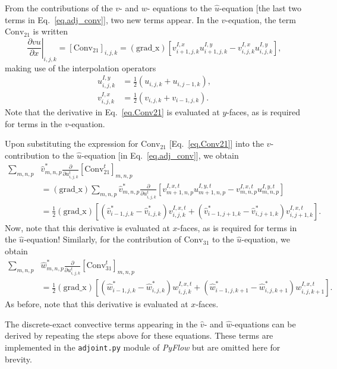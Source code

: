 \documentclass[letterpaper,10pt]{article}
\numberwithin{equation}{section}
\newcommand{\pp}[2]{\frac{\partial #1}{\partial #2}}
\newcommand{\wh}[1]{\widehat{#1}}
\begin{document}
From the contributions of the $v$- and $w$- equations to the
$\wh{u}$-equation [the last two terms in Eq.~\eqref{eq.adj_conv}], two
new terms appear. In the $v$-equation, the term $\mathrm{Conv}_{21}$
is written
\begin{equation}
  \left.\pp{vu}{x}\right|_{i,j,k} =
  \left[\mathrm{Conv}_{21}\right]_{i,j,k} =
  (\mathrm{grad\_x})\left[v_{i+1,j,k}^{I,x}u_{i+1,j,k}^{I,y} -
    v_{i,j,k}^{I,x}u_{i,j,k}^{I,y}\right],
  \label{eq.Conv21}
\end{equation}
making use of the interpolation operators
\begin{align*}
  u_{i,j,k}^{I,y} &= \frac{1}{2}\left(u_{i,j,k} + u_{i,j-1,k}\right), \\
  v_{i,j,k}^{I,x} &= \frac{1}{2}\left(v_{i,j,k} + v_{i-1,j,k}\right).
\end{align*}
Note that the derivative in Eq.~\eqref{eq.Conv21} is evaluated at
$y$-faces, as is required for terms in the $v$-equation.

Upon substituting the expression for $\mathrm{Conv}_{21}$ [Eq.~\eqref{eq.Conv21}] into the $\wh{v}$-contribution to the $\wh{u}$-equation [in Eq.~\eqref{eq.adj_conv}], we obtain
\begin{align*}
  \sum_{m,n,p} &\wh{v}_{m,n,p}^*\pp{}{u_{i,j,k}^t}\left[\mathrm{Conv}_{21}^t\right]_{m,n,p}  \\
  &=(\mathrm{grad\_x})\sum_{m,n,p}\wh{v}_{m,n,p}^*\pp{}{u_{i,j,k}^t}\left[
    v_{m+1,n,p}^{I,x,t}u_{m+1,n,p}^{I,y,t} - v_{m,n,p}^{I,x,t}u_{m,n,p}^{I,y,t}\right] \\
  &=\frac{1}{2}(\mathrm{grad\_x})\left[\left(\wh{v}_{i-1,j,k}^*-\wh{v}_{i,j,k}^*\right)v_{i,j,k}^{I,x,t}
    + \left(\wh{v}_{i-1,j+1,k}^*-\wh{v}_{i,j+1,k}^*\right)v_{i,j+1,k}^{I,x,t}\right].
\end{align*}
Now, note that this derivative is evaluated at $x$-faces, as is required for terms in the $\wh{u}$-equation! Similarly, for the contribution of  $\mathrm{Conv}_{31}$ to the $\wh{u}$-equation, we obtain
\begin{align*}
  \sum_{m,n,p} &\wh{w}_{m,n,p}^*\pp{}{u_{i,j,k}^t}\left[\mathrm{Conv}_{31}^t\right]_{m,n,p}  \\
  &=\frac{1}{2}(\mathrm{grad\_x})\left[\left(\wh{w}_{i-1,j,k}^*-\wh{w}_{i,j,k}^*\right)w_{i,j,k}^{I,x,t}
    + \left(\wh{w}_{i-1,j,k+1}^*-\wh{w}_{i,j,k+1}^*\right)w_{i,j,k+1}^{I,x,t}\right].
\end{align*}
As before, note that this derivative is evaluated at $x$-faces.

The discrete-exact convective terms appearing in the $\wh{v}$- and $\wh{w}$-equations can be derived by repeating the steps above for these equations. These terms are implemented in the \texttt{adjoint.py} module of \textit{PyFlow} but are omitted here for brevity.
\end{document}
